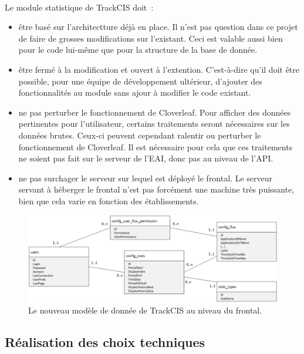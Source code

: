 			\paragraph{}%
			Le module statistique de TrackCIS doit~:
			\begin{itemize}%
			  \item être basé sur l'architectture déjà en place. Il n'est pas question
			  dans ce projet de faire de grosses modifications sur l'existant. Ceci est
			  valable aussi bien pour le code lui-même que pour la structure de la base
			  de donnée.
			  \item être fermé à la modification et ouvert à l'extention. C'est-à-dire
			  qu'il doit être possible, pour une équipe de développement ultérieur,
			  d'ajouter des fonctionnalités au module sans ajour à modifier le code
			  existant.
			  \item ne pas perturber le fonctionnement de Cloverleaf. Pour afficher des
			  données pertinentes pour l'utilisateur, certains traitements seront
			  nécessaires sur les données brutes. Ceux-ci peuvent cependant ralentir ou
			  perturber le fonctionnement de Cloverleaf. Il est nécessaire pour cela que
			  ces traitements ne soient pas fait sur le serveur de l'EAI, donc pas au
			  niveau de l'API.
			  \item ne pas surchager le serveur sur lequel est déployé le frontal. Le
			  serveur servant à héberger le frontal n'est pas forcément une machine très
			  puissante, bien que cela varie en fonction des établissements.
			\end{itemize}
			
			\begin{figure}[H]
				\centering
				\includegraphics[width=16cm]{../img/part3/modele_donnee.png}
				\caption{\label{modele_donnee} Le nouveau modèle de donnée de TrackCIS au
				niveau du frontal.}
			\end{figure}
			
		\subsection{Réalisation des choix techniques}

